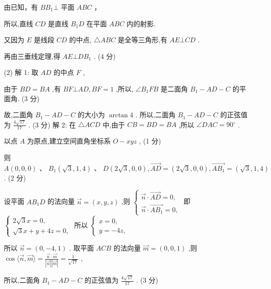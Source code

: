 \documentclass[10pt]{article}
\newcommand*\circled[1]{\tikz[baseline=(char.base)]{\node[shape=circle,draw,inner sep=1.5pt] (char) {\small #1};}}
\begin{document}
 \circled{2} 由已知，有 \(B{B}_{1} \bot\) 平面 \({ABC}\) ，

所以,直线 \({CD}\) 是直线 \({B}_{1}D\) 在平面 \({ABC}\) 内的射影.

又因为 \(E\) 是线段 \({CD}\) 的中点, \(\bigtriangleup {ABC}\) 是全等三角形,有 \({AE} \bot  {CD}\) .

再由三垂线定理,得 \({AE} \bot  D{B}_{1}\) . (4 分)

(2) 解 1: 取 \({AD}\) 的中点 \(F\) ,

由于 \({BD} = {BA}\) ,有 \({BF} \bot  {AD},{BF} = 1\) ,所以, \(\angle {B}_{1}{FB}\) 是二面角 \({B}_{1} - {AD} - C\) 的平面角. (3 分)

故,二面角 \({B}_{1} - {AD} - C\) 的大小为 \(\arctan 4\) . 所以,二面角 \({B}_{1} - {AD} - C\) 的正弦值为 \(\frac{4\sqrt{17}}{17}\) . (3 分) 解 2: 在 \(\bigtriangleup {ACD}\) 中,由于 \({CB} = {BD} = {BA}\) ,所以 \(\angle {DAC} = {90}^{ \circ  }\) .

以点 \(A\) 为原点,建立空间直角坐标系 \(O - {xyz}\) , (1 分)

则 \(A\left( {0,0,0}\right) \text{ 、 }{B}_{1}\left( {\sqrt{3},1,4}\right) \text{ 、 }D\left( {2\sqrt{3},0,0}\right) ,\overrightarrow{AD} = \left( {2\sqrt{3},0,0}\right) ,\overrightarrow{A{B}_{1}} = \left( {\sqrt{3},1,4}\right)\) . (2 分)

设平面 \(A{B}_{1}D\) 的法向量 \(\overrightarrow{n} = \left( {x,y,z}\right)\) ,则 \(\left\{  \begin{array}{l} \overrightarrow{n} \cdot  \overrightarrow{AD} = 0, \\  \overrightarrow{n} \cdot  \overrightarrow{A{B}_{1}} = 0, \end{array}\right.\) 即 \(\left\{  \begin{array}{l} 2\sqrt{3}x = 0, \\  \sqrt{3}x + y + {4z} = 0, \end{array}\right.\) 所以 \(\left\{  \begin{array}{l} x = 0, \\  y =  - {4z}, \end{array}\right.\)

所以 \(\overrightarrow{n} = \left( {0, - 4,1}\right)\) . 取平面 \({ACB}\) 的法向量 \(\overrightarrow{m} = \left( {0,0,1}\right)\) ,则 \(\cos \langle \overrightarrow{n},\overrightarrow{m}\rangle  = \frac{\overrightarrow{n} \cdot  \overrightarrow{m}}{\left| \overrightarrow{n}\right| \left| \overrightarrow{m}\right| } = \frac{1}{\sqrt{17}}\) ,

所以,二面角 \({B}_{1} - {AD} - C\) 的正弦值为 \(\frac{4\sqrt{17}}{17}\) . (3 分)
\end{document}
